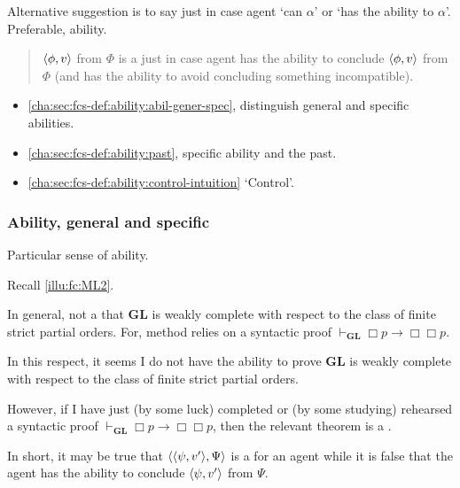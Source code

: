 \begin{note}
  Alternative suggestion is to say \pevent{} just in case agent `can \(\alpha\)' or `has the ability to \(\alpha\)'.
  Preferable, ability.

  \begin{quote}
    \(\langle \phi, v \rangle\) from \(\Phi\) is a \fc{} just in case agent has the ability to conclude \(\langle \phi, v \rangle\) from \(\Phi\) (and has the ability to avoid concluding something incompatible).
  \end{quote}
\end{note}


\begin{note}
  \begin{itemize}[noitemsep]
  \item
    \autoref{cha:sec:fcs-def:ability:abil-gener-spec}, distinguish general and specific abilities.
  \item
    \autoref{cha:sec:fcs-def:ability:past}, specific ability and the past.
  \item
    \autoref{cha:sec:fcs-def:ability:control-intuition} `Control'.
  \end{itemize}
\end{note}

\subsubsection{Ability, general and specific}
\label{cha:sec:fcs-def:ability:abil-gener-spec}

\begin{note}
  Particular sense of ability.

  Recall \autoref{illu:fc:ML2}.

  In general, not a \fc{} that \(\mathbf{GL}\) is weakly complete with respect to the class of finite strict partial orders.
  For, method relies on a syntactic proof \(\vdash_{\mathbf{GL}} \Box p \rightarrow \Box \Box p\).

  In this respect, it seems I do not have the ability to prove \(\mathbf{GL}\) is weakly complete with respect to the class of finite strict partial orders.

  However, if I have just (by some luck) completed or (by some studying) rehearsed a syntactic proof \(\vdash_{\mathbf{GL}} \Box p \rightarrow \Box \Box p\), then the relevant theorem is a \fc{}.

  In short, it may be true that \(\langle \langle \psi, v' \rangle, \Psi \rangle\) is a \fc{} for an agent while it is false that the agent has the ability to conclude \(\langle \psi, v' \rangle\) from \(\Psi\).
\end{note}

